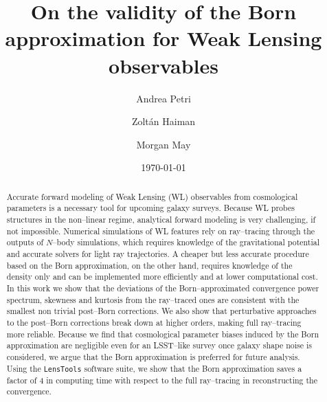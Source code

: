 \documentclass[reprint,aps,prd,superscriptaddress,showkeys,showpacs]{revtex4-1}
\newcommand{\ttt}[1]{\texttt{#1}}
\begin{document}
\title{On the validity of the Born approximation for Weak Lensing observables}

\author{Andrea Petri}

\author{Zolt\'an Haiman}

\author{Morgan May}

\date{\today}

\label{firstpage}

\begin{abstract}
Accurate forward modeling of Weak Lensing (WL) observables from cosmological parameters is a necessary tool for upcoming galaxy surveys. Because WL probes structures in the non--linear regime, analytical forward modeling is very challenging, if not impossible. Numerical simulations of WL features rely on ray--tracing through the outputs of $N$--body simulations, which requires knowledge of the gravitational potential and accurate solvers for light ray trajectories. A cheaper but less accurate procedure based on the Born approximation, on the other hand, requires knowledge of the density only and can be implemented more efficiently and at lower computational cost. In this work we show that the deviations of the Born--approximated convergence power spectrum, skewness and kurtosis from the ray--traced ones are consistent with the smallest non trivial post--Born corrections. We also show that perturbative approaches to the post--Born corrections break down at higher orders, making full ray--tracing more reliable. Because we find that cosmological parameter biases induced by the Born approximation are negligible even for an LSST--like survey once galaxy shape noise is considered, we argue that the Born approximation is preferred for future analysis. Using the \ttt{LensTools} software suite, we show that the Born approximation saves a factor of 4 in computing time with respect to the full ray--tracing in reconstructing the convergence.       
\end{abstract}


\end{document}

